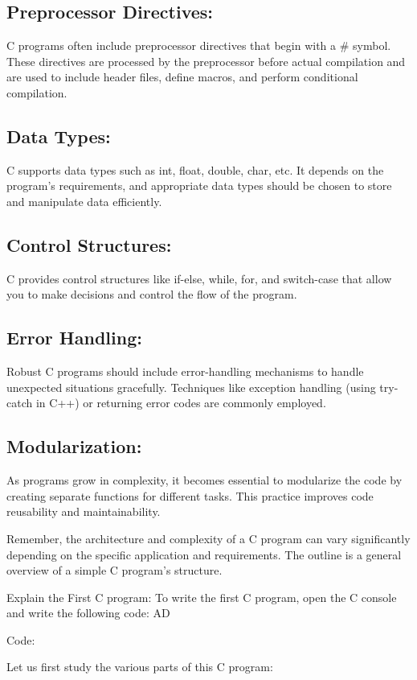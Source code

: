 \documentclass[11pt]{article}
\begin{document}
\subsection{Preprocessor Directives:}
C programs often include preprocessor directives that begin with a \# symbol. These directives are processed by the preprocessor before actual compilation and are used to include header files, define macros, and perform conditional compilation.

\subsection{Data Types:}
C supports data types such as int, float, double, char, etc. It depends on the program's requirements, and appropriate data types should be chosen to store and manipulate data efficiently.

\subsection{Control Structures:}
C provides control structures like if-else, while, for, and switch-case that allow you to make decisions and control the flow of the program.

\subsection{Error Handling:}
Robust C programs should include error-handling mechanisms to handle unexpected situations gracefully. Techniques like exception handling (using try-catch in C++) or returning error codes are commonly employed.

\subsection{Modularization:}
As programs grow in complexity, it becomes essential to modularize the code by creating separate functions for different tasks. This practice improves code reusability and maintainability.

Remember, the architecture and complexity of a C program can vary significantly depending on the specific application and requirements. The outline is a general overview of a simple C program's structure.


Explain the First C program:
To write the first C program, open the C console and write the following code:
AD

Code:


Let us first study the various parts of this C program:
\end{document}
